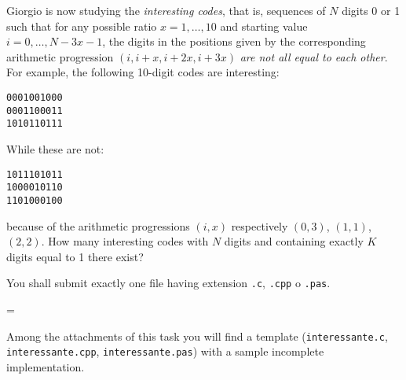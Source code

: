 \usepackage{xcolor}
\usepackage{afterpage}
\usepackage{pifont,mdframed}
\usepackage[bottom]{footmisc}

\makeatletter
\gdef\this@inputfilename{input.txt}
\gdef\this@outputfilename{output.txt}
\makeatother

\newcommand{\inputfile}{\texttt{input.txt}}
\newcommand{\outputfile}{\texttt{output.txt}}

\newenvironment{warning}
  {\par\begin{mdframed}[linewidth=2pt,linecolor=gray]%
    \begin{list}{}{\leftmargin=1cm
                   \labelwidth=\leftmargin}\item[\Large\ding{43}]}
  {\end{list}\end{mdframed}\par}

	Giorgio is now studying the \emph{interesting codes}, that is, sequences of $N$ digits 0 or 1 such that for any possible ratio $x = 1, \ldots, 10$ and starting value $i = 0, \ldots, N-3x-1$, the digits in the positions given by the corresponding arithmetic progression $(i,i+x,i+2x,i+3x)$ \emph{are not all equal to each other}. For example, the following 10-digit codes are interesting:
	\begin{center}
	\texttt{0001001000\\
	0001100011\\
	1010110111}
	\end{center}
	While these are not:
	\begin{center}
	\texttt{1011101011\\
	1000010110\\
	1101000100}
	\end{center}
	because of the arithmetic progressions $(i,x)$ respectively $(0,3)$, $(1,1)$, $(2,2)$. How many interesting codes with $N$ digits and containing exactly $K$ digits equal to 1 there exist?

\Implementation
You shall submit exactly one file having extension \texttt{.c}, \texttt{.cpp} o \texttt{.pas}.

\begin{warning}
Among the attachments of this task you will find a template (\texttt{interessante.c}, \texttt{interessante.cpp}, \texttt{interessante.pas}) with a sample incomplete implementation.
\end{warning}

